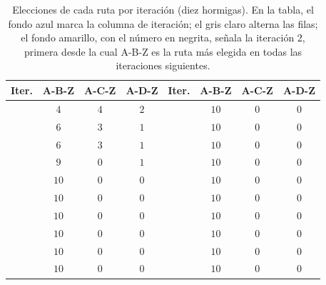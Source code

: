 \begin{table}[H]
\centering
\small
\setlength{\tabcolsep}{6pt}
\renewcommand{\arraystretch}{1.15}
\begin{tabular}{|c|c|c|c|c|c|c|c|}
\hline
\rowcolor{encabezado}\textbf{Iter.} & \textbf{A-B-Z} & \textbf{A-C-Z} & \textbf{A-D-Z} & \textbf{Iter.} & \textbf{A-B-Z} & \textbf{A-C-Z} & \textbf{A-D-Z} \\
\hline
\cellcolor{iteracion}{\bfseries\boldmath $1$} & $4$ & $4$ & $2$ & \cellcolor{iteracion}{\bfseries\boldmath $11$} & $10$ & $0$ & $0$ \\
\hline
\cellcolor{destacado}{\bfseries\boldmath $2$} & \cellcolor{destacado}$6$ & \cellcolor{destacado}$3$ & \cellcolor{destacado}$1$ & \cellcolor{iteracion}{\bfseries\boldmath $12$} & \cellcolor{cebra}$10$ & \cellcolor{cebra}$0$ & \cellcolor{cebra}$0$ \\
\hline
\cellcolor{iteracion}{\bfseries\boldmath $3$} & $6$ & $3$ & $1$ & \cellcolor{iteracion}{\bfseries\boldmath $13$} & $10$ & $0$ & $0$ \\
\hline
\cellcolor{iteracion}{\bfseries\boldmath $4$} & \cellcolor{cebra}$9$ & \cellcolor{cebra}$0$ & \cellcolor{cebra}$1$ & \cellcolor{iteracion}{\bfseries\boldmath $14$} & \cellcolor{cebra}$10$ & \cellcolor{cebra}$0$ & \cellcolor{cebra}$0$ \\
\hline
\cellcolor{iteracion}{\bfseries\boldmath $5$} & $10$ & $0$ & $0$ & \cellcolor{iteracion}{\bfseries\boldmath $15$} & $10$ & $0$ & $0$ \\
\hline
\cellcolor{iteracion}{\bfseries\boldmath $6$} & \cellcolor{cebra}$10$ & \cellcolor{cebra}$0$ & \cellcolor{cebra}$0$ & \cellcolor{iteracion}{\bfseries\boldmath $16$} & \cellcolor{cebra}$10$ & \cellcolor{cebra}$0$ & \cellcolor{cebra}$0$ \\
\hline
\cellcolor{iteracion}{\bfseries\boldmath $7$} & $10$ & $0$ & $0$ & \cellcolor{iteracion}{\bfseries\boldmath $17$} & $10$ & $0$ & $0$ \\
\hline
\cellcolor{iteracion}{\bfseries\boldmath $8$} & \cellcolor{cebra}$10$ & \cellcolor{cebra}$0$ & \cellcolor{cebra}$0$ & \cellcolor{iteracion}{\bfseries\boldmath $18$} & \cellcolor{cebra}$10$ & \cellcolor{cebra}$0$ & \cellcolor{cebra}$0$ \\
\hline
\cellcolor{iteracion}{\bfseries\boldmath $9$} & $10$ & $0$ & $0$ & \cellcolor{iteracion}{\bfseries\boldmath $19$} & $10$ & $0$ & $0$ \\
\hline
\cellcolor{iteracion}{\bfseries\boldmath $10$} & \cellcolor{cebra}$10$ & \cellcolor{cebra}$0$ & \cellcolor{cebra}$0$ & \cellcolor{iteracion}{\bfseries\boldmath $20$} & \cellcolor{cebra}$10$ & \cellcolor{cebra}$0$ & \cellcolor{cebra}$0$ \\
\hline
\end{tabular}
\caption{Elecciones de cada ruta por iteración (diez hormigas). En la tabla, el fondo azul marca la columna de iteración; el gris claro alterna las filas; el fondo amarillo, con el número en negrita, señala la iteración 2, primera desde la cual A-B-Z es la ruta más elegida en todas las iteraciones siguientes.}
\label{tab:p4b-conteo}
\end{table}
